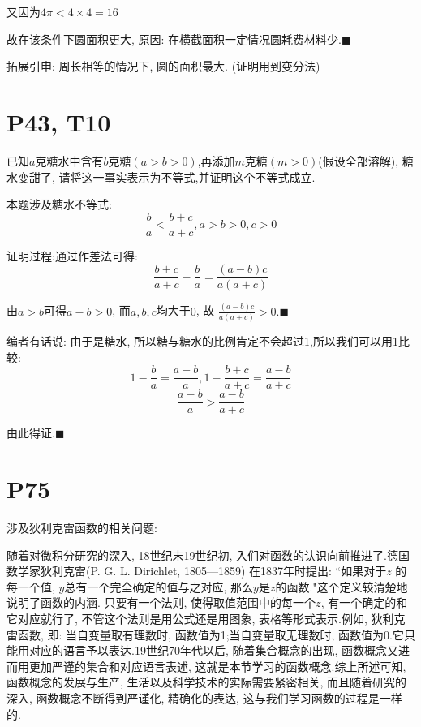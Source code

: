 \documentclass{book}
\begin{document}
    又因为$\displaystyle 4\pi < 4 \times 4 = 16$

    故在该条件下圆面积更大, 原因: 在横截面积一定情况圆耗费材料少.$\blacksquare$

    \textcolor[rgb]{0.38,0.11,0.2}{拓展引申: 周长相等的情况下, 圆的面积最大. (证明用到变分法)}
    \section{\textcolor[rgb]{0.11,0.65,0.52}{P43, T10}}
    \begin{boxB}
        已知$a$克糖水中含有$b$克糖$(a>b>0)$,再添加$m$克糖$(m>0)$(假设全部溶解), 糖水变甜了, 请将这一事实表示为不等式,并证明这个不等式成立.
    \end{boxB}

    本题涉及\textcolor[rgb]{0.38,0.11,0.2}{糖水不等式}:
    $$
    \frac{b}{a} < \frac{b+c}{a+c}, a>b>0, c>0
    $$

    证明过程:通过\textcolor[rgb]{0.75,0.17,0.22}{作差法}可得:
    $$
    \frac{b+c}{a+c} - \frac{b}{a} = \frac{(a-b)c}{a(a+c)}
    $$

    由$a>b$可得$a-b>0$, 而$a,b,c$均大于$0$, 故 $\displaystyle \frac{(a-b)c}{a(a+c)}>0. \blacksquare$

    编者有话说: 由于是糖水, 所以糖与糖水的比例肯定不会超过1,所以我们可以用1比较:
    $$
    1-\frac{b}{a}=\frac{a-b}{a},1-\frac{b+c}{a+c}=\frac{a-b}{a+c}
    $$
    $$
    \frac{a-b}{a}>\frac{a-b}{a+c}
    $$

    由此得证.$\blacksquare$

    \section{\textcolor[rgb]{0.11,0.65,0.52}{P75}}
    涉及\textcolor[rgb]{0.38,0.11,0.2}{狄利克雷函数}的相关问题:

    随着对微积分研究的深入, 18世纪末19世纪初, 入们对函数的认识向前推进了.德国数学家狄利克雷(P. G. L. Dirichlet, 1805—1859) 在1837年时提出: ``如果对于$z$ 的每一个值, $y$总有一个完全确定的值与之对应, 那么$y$是$z$的函数."这个定义较清楚地说明了函数的内涵. 只要有一个法则, 使得取值范围中的每一个$z$, 有一个确定的和它对应就行了, 不管这个法则是用公式还是用图象, 表格等形式表示.例如, 狄利克雷函数, 即: 当自变量取有理数时, 函数值为1;当自变量取无理数时, 函数值为0.它只能用对应的语言予以表达.19世纪70年代以后, 随着集合概念的出现, 函数概念又进而用更加严谨的集合和对应语言表述, 这就是本节学习的函数概念.综上所述可知, 函数概念的发展与生产, 生活以及科学技术的实际需要紧密相关, 而且随着研究的深入, 函数概念不断得到严谨化, 精确化的表达, 这与我们学习函数的过程是一样的.
\end{document}
